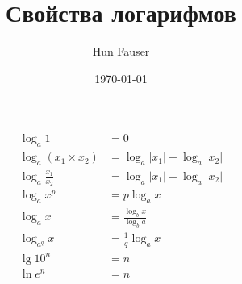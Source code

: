 \documentclass[a4paper,12pt]{article}
\author{Hun Fauser}
\title{Свойства логарифмов}
\date{\today}
\begin{document}

\maketitle

\begin{align*}
\log_{a}1 &= 0 \\
\log_{a}(x_{1} \times x_{2}) &= \log_{a}|x_{1}| + \log_{a}|x_{2}| \\
\log_{a}\frac{x_{1}}{x_{2}} &= \log_{a}|x_{1}| - \log_{a}|x_{2}| \\
\log_{a}x^p &= p\log_{a}x \\
\log_{a}x &= \frac{\log_{b}x}{\log_{b}a} \\
\log_{a^q}x &= \frac{1}{q}\log_{a}x \\
\lg10^n &= n \\
\ln{e^n} &= n
\end{align*}
\end{document}
